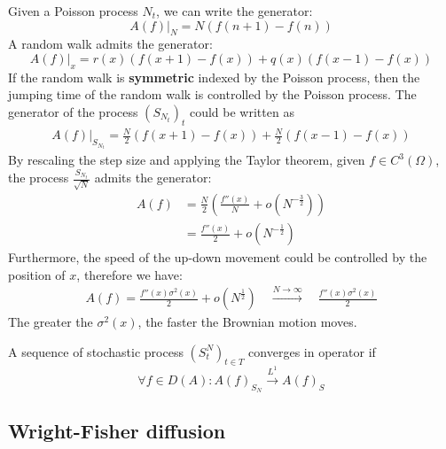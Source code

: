 \begin{example}
Given a Poisson process $N_t$, we can write the generator:
\begin{equation*}
	A(f)|_N = N (f(n+1) - f(n)) 
\end{equation*}
A random walk admits the generator:
\begin{equation*}
	A(f)|_x = r(x)(f(x+1) - f(x)) + q(x)(f(x-1) - f(x))
\end{equation*}
If the random walk is \textbf{symmetric} indexed by the Poisson process, then the jumping time of the random walk is controlled by the Poisson process. The generator of the process $(S_{N_t})_t$ could be written as
\begin{align*}
	A(f)|_{S_{N_t}} = \frac{N}{2} (f(x+1) - f(x)) + \frac{N}{2} (f(x-1) - f(x))
\end{align*} 
By rescaling the step size and applying the Taylor theorem, given $f \in C^3(\Omega)$, the process $\frac{S_{N_t}}{\sqrt{N}}$ admits the generator:
\begin{align*}
	A(f) &= \frac{N}{2}(\frac{f''(x)}{N} + o(N^{-\frac{3}{2}}))\\
	&= \frac{f''(x)}{2} + o(N^{-\frac{1}{2}})
\end{align*}
Furthermore, the speed of the up-down movement could be controlled by the position of $x$, therefore we have:
\begin{align*}
	A(f) = \frac{f''(x) \sigma^2(x)}{2} + o(N^{\frac{1}{2}}) \quad
	 \overset{N \rightarrow \infty}{\longrightarrow} \quad
	 \frac{f''(x) \sigma^2(x)}{2}
\end{align*} 
The greater the $\sigma^2(x)$, the faster the Brownian motion moves.
\end{example}

\begin{definition}
	A sequence of stochastic process $(S_t^N)_{t \in T}$ converges in operator if 
	\begin{equation*}
		\forall f \in D(A): A(f)_{S_N} \overset{L^1}{\rightarrow} A(f)_S
	\end{equation*}
\end{definition}
\begin{remark}
	
\end{remark}


\begin{theorem}
\end{theorem}


\subsection{Wright-Fisher diffusion}
\begin{definition}[Diffusion]
\end{definition}

\begin{theorem}
\end{theorem}

